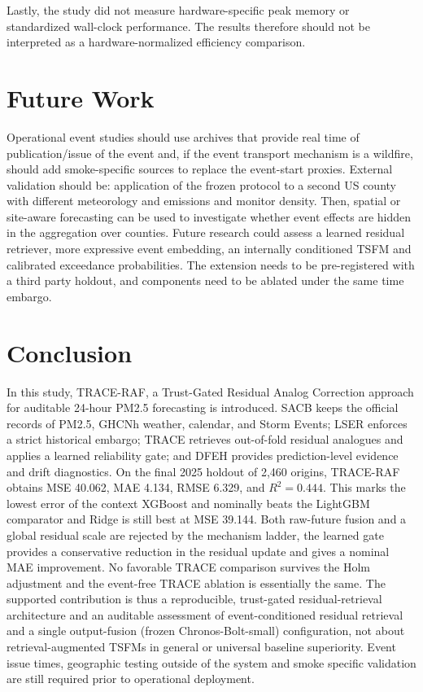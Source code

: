 \documentclass{ieeeaccess}
\begin{document}
Lastly, the study did not measure hardware-specific peak memory or standardized wall-clock performance. The results therefore should not be interpreted as a hardware-normalized efficiency comparison.

\section{Future Work}

Operational event studies should use archives that provide real time of publication/issue of the event and, if the event transport mechanism is a wildfire, should add smoke-specific sources to replace the event-start proxies. External validation should be: application of the frozen protocol to a second US county with different meteorology and emissions and monitor density. Then, spatial or site-aware forecasting can be used to investigate whether event effects are hidden in the aggregation over counties. Future research could assess a learned residual retriever, more expressive event embedding, an internally conditioned TSFM and calibrated exceedance probabilities. The extension needs to be pre-registered with a third party holdout, and components need to be ablated under the same time embargo.

\section{Conclusion}

In this study, TRACE-RAF, a Trust-Gated Residual Analog Correction approach for auditable 24-hour PM2.5 forecasting is introduced. SACB keeps the official records of PM2.5, GHCNh weather, calendar, and Storm Events; LSER enforces a strict historical embargo; TRACE retrieves out-of-fold residual analogues and applies a learned reliability gate; and DFEH provides prediction-level evidence and drift diagnostics. On the final 2025 holdout of 2,460 origins, TRACE-RAF obtains MSE 40.062, MAE 4.134, RMSE 6.329, and $R^2=0.444$. This marks the lowest error of the context XGBoost and nominally beats the LightGBM comparator and Ridge is still best at MSE 39.144. Both raw-future fusion and a global residual scale are rejected by the mechanism ladder, the learned gate provides a conservative reduction in the residual update and gives a nominal MAE improvement. No favorable TRACE comparison survives the Holm adjustment and the event-free TRACE ablation is essentially the same. The supported contribution is thus a reproducible, trust-gated residual-retrieval architecture and an auditable assessment of event-conditioned residual retrieval and a single output-fusion (frozen Chronos-Bolt-small) configuration, not about retrieval-augmented TSFMs in general or universal baseline superiority. Event issue times, geographic testing outside of the system and smoke specific validation are still required prior to operational deployment.
\end{document}
